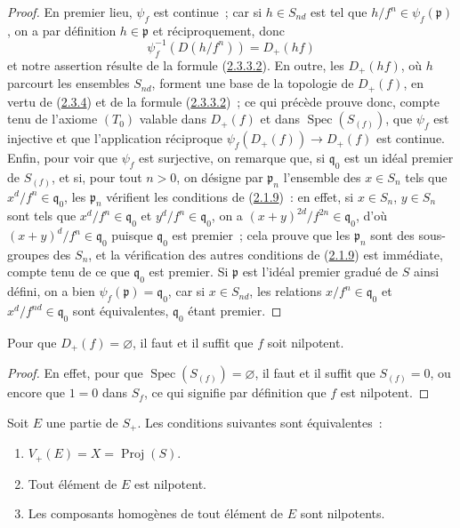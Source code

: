 \begin{proof}
En premier lieu, $\psi_f$ est continue~; car si $h\in S_{nd}$ est tel que
$h/f^n\in\psi_f(\mathfrak{p})$, on a par définition
$h\in\mathfrak{p}$ et réciproquement, donc
\[
  \psi_f^{-1}(D(h/f^n))=D_+(hf)
\]
et notre assertion résulte de la formule
(\hyperref[II.2.3.3.2-fr]{2.3.3.2}). En outre, les $D_+(hf)$, où $h$
parcourt les ensembles $S_{nd}$, forment une base de la topologie de
$D_+(f)$, en vertu de (\hyperref[II.2.3.4-fr]{2.3.4}) et de la formule
(\hyperref[II.2.3.3.2-fr]{2.3.3.2})~; ce
qui précède prouve donc, compte tenu de l'axiome $(T_0)$ valable dans
$D_+(f)$ et dans $\operatorname{Spec}(S_{(f)})$, que $\psi_f$ est injective
et que l'application réciproque
$\psi_f(D_+(f))\longrightarrow D_+(f)$ est continue. Enfin, pour voir que
$\psi_f$ est surjective, on remarque que, si $\mathfrak{q}_0$ est un idéal
premier de $S_{(f)}$, et si, pour tout $n>0$, on désigne par
$\mathfrak{p}_n$ l'ensemble des $x\in S_n$ tels que
$x^d/f^n\in\mathfrak{q}_0$, les $\mathfrak{p}_n$ vérifient les conditions
de (\hyperref[II.2.1.9-fr]{2.1.9})~: en effet, si $x\in S_n$, $y\in S_n$
sont tels que $x^d/f^n\in\mathfrak{q}_0$ et
$y^d/f^n\in\mathfrak{q}_0$, on a
$(x+y)^{2d}/f^{2n}\in\mathfrak{q}_0$, d'où
$(x+y)^d/f^n\in\mathfrak{q}_0$ puisque $\mathfrak{q}_0$ est premier~;
cela prouve que les $\mathfrak{p}_n$ sont des sous-groupes des $S_n$, et la
vérification des autres conditions de
(\hyperref[II.2.1.9-fr]{2.1.9}) est immédiate, compte tenu de ce que
$\mathfrak{q}_0$ est premier. Si $\mathfrak{p}$ est l'idéal premier gradué
de $S$ ainsi défini, on a bien
$\psi_f(\mathfrak{p})=\mathfrak{q}_0$, car si $x\in S_{nd}$, les relations
$x/f^n\in\mathfrak{q}_0$ et $x^d/f^{nd}\in\mathfrak{q}_0$ sont
équivalentes, $\mathfrak{q}_0$ étant premier.
\end{proof}

\begin{corollary}[2.3.7]
\label{II.2.3.7-fr}
Pour que $D_+(f)=\varnothing$, il faut et il suffit que $f$ soit nilpotent.
\end{corollary}

\begin{proof}
En effet, pour que $\operatorname{Spec}(S_{(f)})=\varnothing$, il faut et
il suffit que $S_{(f)}=0$, ou encore que $1=0$ dans $S_f$, ce qui signifie
par définition que $f$ est nilpotent.
\end{proof}

\begin{corollary}[2.3.8]
\label{II.2.3.8-fr}
Soit $E$ une partie de $S_+$. Les conditions suivantes sont équivalentes~:
\begin{enumerate}
  \item[\rm a)] $V_+(E)=X=\operatorname{Proj}(S)$.
  \item[\rm b)] Tout élément de $E$ est nilpotent.
  \item[\rm c)] Les composants homogènes de tout élément de $E$ sont
    nilpotents.
\end{enumerate}
\end{corollary}

